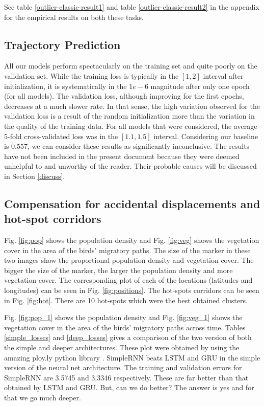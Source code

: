 \documentclass[letterpaper, 10pt, conference]{ieeeconf}  %
\begin{document}
	See table \ref{outlier-classic-result1} and table \ref{outlier-classic-result2} in the appendix for the empirical results on both these tasks.

\subsection{Trajectory Prediction}
	All our models perform spectacularly on the training set and quite poorly on the validation set. While the training loss is typically in the $[1,2]$ interval after initialization, it is systematically in the $1e-6$ magnitude after only one epoch (for all models). The validation loss, although improving for the first epochs, decreases at a much slower rate. In that sense, the high variation observed for the validation loss is a result of the random initialization more than the variation in the quality of the training data. For all models that were considered, the average 5-fold cross-validated loss was in the $[1.1, 1.5]$ interval. Considering our baseline is $0.557$, we can consider these results as significantly inconclusive. The results have not been included in the present document because they were deemed unhelpful to and unworthy of the reader. Their probable causes will be discussed in Section \ref{discuss}.

\subsection{Compensation for accidental displacements and hot-spot corridors}
	Fig. \ref{fig:pop} shows the population density and Fig. \ref{fig:veg} shows the vegetation cover in the area of the birds' migratory paths. The size of the marker in these two images show the proportional population density and vegetation cover. The bigger the size of the marker, the larger the population density and more vegetation cover. The corresponding plot of each of the locations (latitudes and longitudes) can be seen in Fig. \ref{fig:positions}. The hot-spots corridors can be seen in Fig. \ref{fig:hot}. There are 10 hot-spots which were the best obtained clusters.

Fig. \ref{fig:pop_1} shows the population density and Fig. \ref{fig:veg_1} shows the vegetation cover in the area of the birds' migratory paths across time. Tables \ref{simple_losses} and \ref{deep_losses} gives a comparison of the two version of both the simple and deeper architectures. These plot were obtained by using the amazing ploy.ly python library \cite{plotly}. SimpleRNN beats LSTM and GRU in the simple version of the neural net architecture. The training and validation errors for SimpleRNN are 3.5745 and 3.3346 respectively. These are far better than that obtained by LSTM and GRU. But, can we do better? The answer is yes and for that we go much deeper.
\end{document}
